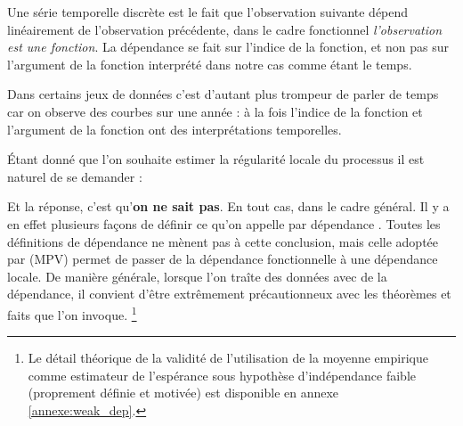
Une série temporelle discrète est le fait que l'observation suivante dépend linéairement de l'observation précédente, dans le cadre fonctionnel \emph{l'observation est une fonction}. La dépendance se fait sur l'indice de la fonction, et non pas sur l'argument de la fonction interprété dans notre cas comme étant le temps.

\bigskip

\noindent Dans certains jeux de données c'est d'autant plus trompeur de parler de temps car on observe des courbes sur une année : à la fois l'indice de la fonction et l'argument de la fonction ont des interprétations temporelles.

\smallskip

\noindent{}

\bigskip

\noindent Étant donné que l'on souhaite estimer la régularité locale du processus il est naturel de se demander :

\noindent Et la réponse, c'est qu'\textbf{on ne sait pas}. En tout cas, dans le cadre général. Il y a en effet plusieurs façons de définir ce qu'on appelle par \og dépendance \fg. Toutes les définitions de dépendance ne mènent pas à cette conclusion, mais celle adoptée par (MPV) permet de passer de la dépendance fonctionnelle à une dépendance locale. De manière générale, lorsque l'on traîte des données avec de la dépendance, il convient d'être extrêmement précautionneux avec les théorèmes et \og faits \fg que l'on invoque. \footnote{Le détail théorique de la validité de l'utilisation de la moyenne empirique comme estimateur de l'espérance sous hypothèse d'indépendance faible (proprement définie et motivée) est disponible en annexe \ref{annexe:weak_dep}.}
